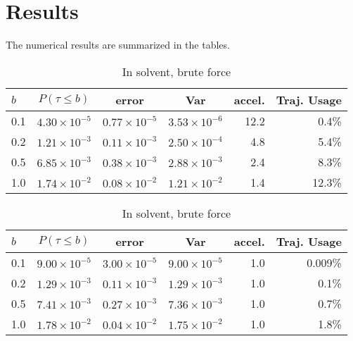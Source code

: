 \documentclass[aip,jcp,a4paper,reprint,onecolumn]{revtex4-1}
\begin{document}
\section{Results}
The numerical results are summarized in the tables.
\begin{table}[th]
  \centering
  \caption{In solvent, variance reduction}
  \begin{tabular*}{0.8\textwidth}{@{\extracolsep{\fill}}lcccrr}
    \hline\hline
    $b$ & $P (\tau \leq b)$ & error & Var & accel. & Traj. Usage \\\hline
    0.1 & $4.30\times 10^{-5}$ & $0.77\times 10^{-5}$ & $3.53\times10^{-6}$ &12.2 & 0.4\%\\
    0.2 & $1.21\times 10^{-3}$ & $0.11\times 10^{-3}$ & $2.50\times10^{-4}$ & 4.8 & 5.4\%\\
    0.5 & $6.85\times 10^{-3}$ & $0.38\times 10^{-3}$ & $2.88\times10^{-3}$ & 2.4 & 8.3\%\\
    1.0 & $1.74\times 10^{-2}$ & $0.08\times 10^{-2}$ & $1.21\times10^{-2}$ & 1.4 &12.3\%\\
    \hline\hline
  \end{tabular*}
  \caption{In solvent, brute force}
  \begin{tabular*}{0.8\textwidth}{@{\extracolsep{\fill}}lcccrr}
    \hline\hline
    $b$ & $P (\tau \leq b)$ & error & Var & accel. & Traj. Usage \\\hline
    0.1 & $9.00\times 10^{-5}$ & $3.00\times 10^{-5}$ & $9.00\times10^{-5}$ & 1.0 & 0.009\%\\
    0.2 & $1.29\times 10^{-3}$ & $0.11\times 10^{-3}$ & $1.29\times10^{-3}$ & 1.0 & 0.1\%\\
    0.5 & $7.41\times 10^{-3}$ & $0.27\times 10^{-3}$ & $7.36\times10^{-3}$ & 1.0 & 0.7\%\\
    1.0 & $1.78\times 10^{-2}$ & $0.04\times 10^{-2}$ & $1.75\times10^{-2}$ & 1.0 & 1.8\%\\
    \hline\hline
  \end{tabular*}
\end{table}
\end{document}
